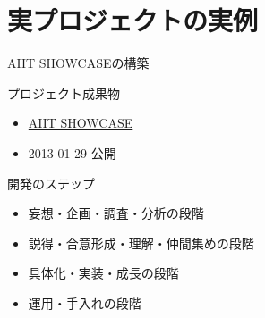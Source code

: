 \documentclass{beamer}
\begin{document}
\section{実プロジェクトの実例}
\label{sec-3}
\begin{frame}[label=sec-3-1]{AIIT SHOWCASEの構築}
\begin{block}{プロジェクト成果物}
\begin{itemize}
\item \href{http://showcase.aiit.ac.jp/}{AIIT SHOWCASE}
\item 2013-01-29 公開
\end{itemize}
\end{block}

\begin{block}{開発のステップ}
\begin{itemize}
\item 妄想・企画・調査・分析の段階
\item 説得・合意形成・理解・仲間集めの段階
\item 具体化・実装・成長の段階
\item 運用・手入れの段階
\end{itemize}
\end{block}
\end{frame}
\end{document}
